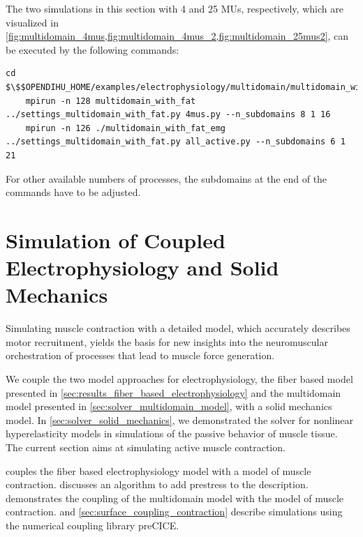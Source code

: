 \begin{reproduce_no_break}
  The two simulations in this section with 4 and 25 MUs, respectively, which are visualized in \cref{fig:multidomain_4mus,fig:multidomain_4mus_2,fig:multidomain_25mus2}, can be executed by the following commands:
  \begin{lstlisting}[columns=fullflexible,breaklines=true,postbreak=\mbox{\textcolor{gray}{$\hookrightarrow$}\space}]
    cd $\$$OPENDIHU_HOME/examples/electrophysiology/multidomain/multidomain_with_fat/build_release
    mpirun -n 128 multidomain_with_fat ../settings_multidomain_with_fat.py 4mus.py --n_subdomains 8 1 16
    mpirun -n 126 ./multidomain_with_fat_emg ../settings_multidomain_with_fat.py all_active.py --n_subdomains 6 1 21
  \end{lstlisting}
  For other available numbers of processes, the subdomains at the end of the commands have to be adjusted.
\end{reproduce_no_break}

%

%

\section{Simulation of Coupled Electrophysiology and Solid Mechanics}\label{sec:coupled_electrophysiology_and_solid_mechanics}

Simulating muscle contraction with a detailed model, which accurately describes motor recruitment,
yields the basis for new insights into the neuromuscular orchestration of processes that lead to muscle force generation.

We couple the two model approaches for electrophysiology, the fiber based model presented in \cref{sec:results_fiber_based_electrophysiology} and the multidomain model presented in \cref{sec:solver_multidomain_model}, with a solid mechanics model. 
In \cref{sec:solver_solid_mechanics}, we demonstrated the solver for nonlinear hyperelasticity models in simulations of the passive behavior of muscle tissue. The current section aims at simulating active muscle contraction.

 couples the fiber based electrophysiology model with a model of muscle contraction.  discusses an algorithm to add prestress to the description.  demonstrates the coupling of the multidomain model with the model of muscle contraction.  and \cref{sec:surface_coupling_contraction} describe simulations using the numerical coupling library preCICE.

